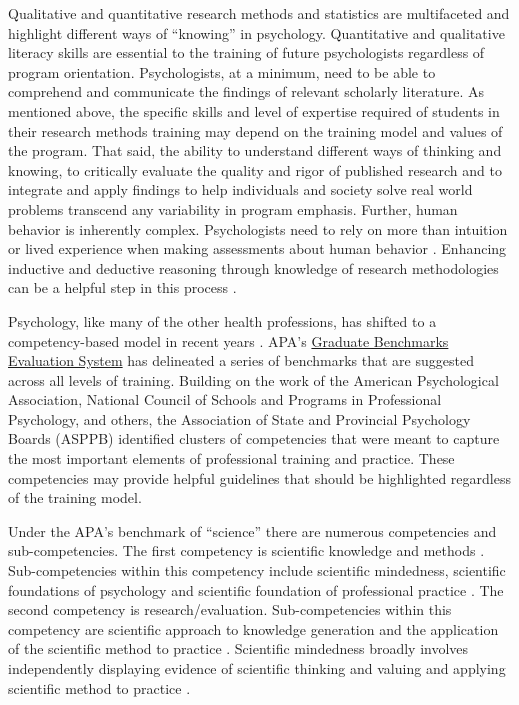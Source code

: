 \documentclass[
  11pt,
]{book}
\begin{document}
Qualitative and quantitative research methods and statistics are multifaceted and highlight different ways of ``knowing'' in psychology. Quantitative and qualitative literacy skills are essential to the training of future psychologists regardless of program orientation. Psychologists, at a minimum, need to be able to comprehend and communicate the findings of relevant scholarly literature. As mentioned above, the specific skills and level of expertise required of students in their research methods training may depend on the training model and values of the program. That said, the ability to understand different ways of thinking and knowing, to critically evaluate the quality and rigor of published research and to integrate and apply findings to help individuals and society solve real world problems transcend any variability in program emphasis. Further, human behavior is inherently complex. Psychologists need to rely on more than intuition or lived experience when making assessments about human behavior \citep{dumper_psychological_2019}. Enhancing inductive and deductive reasoning through knowledge of research methodologies can be a helpful step in this process \citep{dumper_psychological_2019}.

Psychology, like many of the other health professions, has shifted to a competency-based model in recent years \citep{kaslow_competency_2009}. APA's \href{https://www.apa.org/ed/graduate/benchmarks-evaluation-system}{Graduate Benchmarks Evaluation System} has delineated a series of benchmarks that are suggested across all levels of training. Building on the work of the American Psychological Association, National Council of Schools and Programs in Professional Psychology, and others, the Association of State and Provincial Psychology Boards (ASPPB) identified clusters of competencies that were meant to capture the most important elements of professional training and practice. These competencies may provide helpful guidelines that should be highlighted regardless of the training model.

Under the APA's benchmark of ``science'' there are numerous competencies and sub-competencies. The first competency is scientific knowledge and methods \citep{noauthor_benchmarks_2012}. Sub-competencies within this competency include scientific mindedness, scientific foundations of psychology and scientific foundation of professional practice \citep{noauthor_benchmarks_2012}. The second competency is research/evaluation. Sub-competencies within this competency are scientific approach to knowledge generation and the application of the scientific method to practice \citep{noauthor_benchmarks_2012}. Scientific mindedness broadly involves independently displaying evidence of scientific thinking and valuing and applying scientific method to practice \citep{noauthor_benchmarks_2012}.
\end{document}
